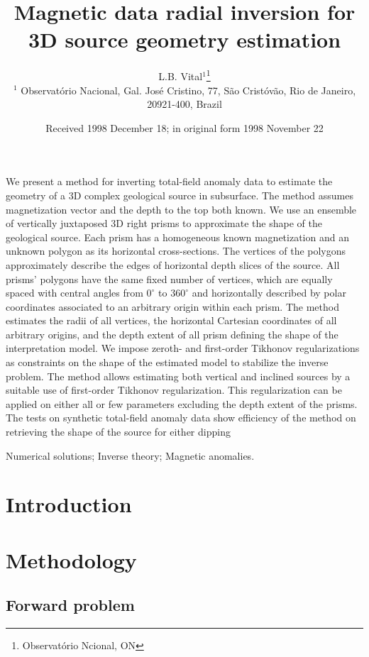 \documentclass[extra,mreferee]{gji}
\title[Geophys.\ J.\ Int.: Magnetic radial inversion]
  {Magnetic data radial inversion for 3D source geometry estimation}
\author[L.B. Vital, V.C. Oliveira Jr., V.C.F. Barbosa]
  {L.B. Vital$^1$\thanks{Observatório Ncional, ON}\\
  $^1$ Observat{\'o}rio Nacional, Gal. Jos{\'e} Cristino, 77, São Crist{\'o}v{\~a}o,
  Rio de Janeiro, 20921-400, Brazil
  }
\date{Received 1998 December 18; in original form 1998 November 22}
\begin{document}
\label{firstpage}

\maketitle


\begin{summary}
We present a method for inverting total-field anomaly data to estimate the geometry of a 3D complex geological source in subsurface. The method assumes magnetization vector and the depth to the top both known. We use an ensemble of vertically juxtaposed 3D right prisms to approximate the shape of the geological source. Each prism has a homogeneous known magnetization and an unknown polygon as its horizontal cross-sections. The vertices of the polygons approximately describe the edges of horizontal depth slices of the source. All prisms’ polygons have the same fixed number of vertices, which are equally spaced with central angles from $0^{\circ}$ to $360^{\circ}$ and horizontally described by polar coordinates associated to an arbitrary origin within each prism. The method estimates the radii of all vertices, the horizontal Cartesian coordinates of all arbitrary origins, and the depth extent of all prism defining the shape of the interpretation model. We impose zeroth- and first-order Tikhonov regularizations as constraints on the shape of the estimated model to stabilize the inverse problem. The method allows estimating both vertical and inclined sources by a suitable use of first-order Tikhonov regularization. This regularization can be applied on either all or few parameters excluding the depth extent of the prisms. The tests on synthetic total-field anomaly data show efficiency of the method on retrieving the shape of the source for either dipping
\end{summary}

\begin{keywords}
 Numerical solutions; Inverse theory; Magnetic anomalies.
\end{keywords}

\section{Introduction}


\section{Methodology}\label{sec:metodo}

\subsection{Forward problem}
\end{document}
